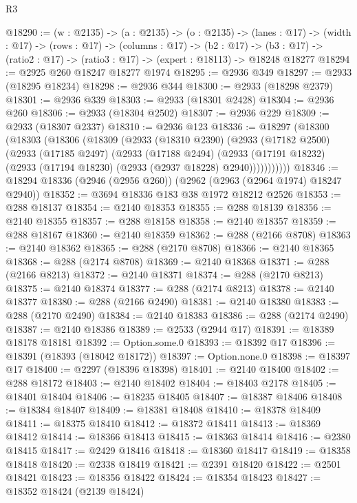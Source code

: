 \begin{lexlean}{R3}
\begin{coremodule}
@18290 := (w : @2135) ->
  (a : @2135) ->
  (o : @2135) ->
  (lanes : @17) ->
  (width : @17) ->
  (rows : @17) ->
  (columns : @17) ->
  (b2 : @17) -> (b3 : @17) -> (ratio2 : @17) -> (ratio3 : @17) -> (expert : @18113) -> @18248 @18277
@18294 := @2925 @260 @18247 @18277 @1974
@18295 := @2936 @349
@18297 := @2933 (@18295 @18234)
@18298 := @2936 @344
@18300 := @2933 (@18298 @2379)
@18301 := @2936 @339
@18303 := @2933 (@18301 @2428)
@18304 := @2936 @260
@18306 := @2933 (@18304 @2502)
@18307 := @2936 @229
@18309 := @2933 (@18307 @2337)
@18310 := @2936 @123
@18336 := @18297
    (@18300
      (@18303
        (@18306
          (@18309
            (@2933
              (@18310 @2390)
              (@2933
                (@17182 @2500)
                (@2933
                  (@17185 @2497)
                  (@2933
                    (@17188 @2494)
                    (@2933
                      (@17191 @18232)
                      (@2933 (@17194 @18230) (@2933 (@2937 @18228) @2940)))))))))))
@18346 := @18294 @18336 (@2946 (@2956 @260)) (@2962 (@2963 (@2964 @1974) @18247 @2940))
@18352 := @3694 @18336 @183 @38 @1972 @18212 @2526
@18353 := @288 @18137
@18354 := @2140 @18353
@18355 := @288 @18139
@18356 := @2140 @18355
@18357 := @288 @18158
@18358 := @2140 @18357
@18359 := @288 @18167
@18360 := @2140 @18359
@18362 := @288 (@2166 @8708)
@18363 := @2140 @18362
@18365 := @288 (@2170 @8708)
@18366 := @2140 @18365
@18368 := @288 (@2174 @8708)
@18369 := @2140 @18368
@18371 := @288 (@2166 @8213)
@18372 := @2140 @18371
@18374 := @288 (@2170 @8213)
@18375 := @2140 @18374
@18377 := @288 (@2174 @8213)
@18378 := @2140 @18377
@18380 := @288 (@2166 @2490)
@18381 := @2140 @18380
@18383 := @288 (@2170 @2490)
@18384 := @2140 @18383
@18386 := @288 (@2174 @2490)
@18387 := @2140 @18386
@18389 := @2533 (@2944 @17)
@18391 := @18389 @18178 @18181
@18392 := Option.some.{0}
@18393 := @18392 @17
@18396 := @18391 (@18393 (@18042 @18172))
@18397 := Option.none.{0}
@18398 := @18397 @17
@18400 := @2297 (@18396 @18398)
@18401 := @2140 @18400
@18402 := @288 @18172
@18403 := @2140 @18402
@18404 := @18403 @2178
@18405 := @18401 @18404
@18406 := @18235 @18405
@18407 := @18387 @18406
@18408 := @18384 @18407
@18409 := @18381 @18408
@18410 := @18378 @18409
@18411 := @18375 @18410
@18412 := @18372 @18411
@18413 := @18369 @18412
@18414 := @18366 @18413
@18415 := @18363 @18414
@18416 := @2380 @18415
@18417 := @2429 @18416
@18418 := @18360 @18417
@18419 := @18358 @18418
@18420 := @2338 @18419
@18421 := @2391 @18420
@18422 := @2501 @18421
@18423 := @18356 @18422
@18424 := @18354 @18423
@18427 := @18352 @18424 (@2139 @18424)

\end{coremodule}
\end{lexlean}
